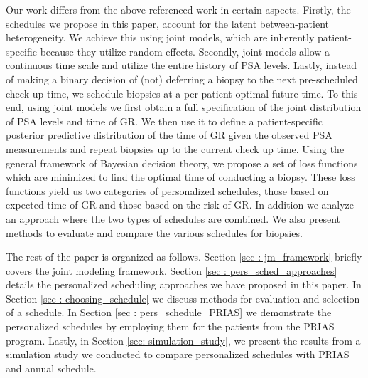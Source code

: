 Our work differs from the above referenced work in certain aspects. Firstly, the schedules we propose in this paper, account for the latent between-patient heterogeneity. We achieve this using joint models, which are inherently patient-specific because they utilize random effects. Secondly, joint models allow a continuous time scale and utilize the entire history of PSA levels. Lastly, instead of making a binary decision of (not) deferring a biopsy to the next pre-scheduled check up time, we schedule biopsies at a per patient optimal future time. To this end, using joint models we first obtain a full specification of the joint distribution of PSA levels and time of GR. We then use it to define a patient-specific posterior predictive distribution of the time of GR given the observed PSA measurements and repeat biopsies up to the current check up time. Using the general framework of Bayesian decision theory, we propose a set of loss functions which are minimized to find the optimal time of conducting a biopsy. These loss functions yield us two categories of personalized schedules, those based on expected time of GR and those based on the risk of GR. In addition we analyze an approach where the two types of schedules are combined. We also present methods to evaluate and compare the various schedules for biopsies.

The rest of the paper is organized as follows. Section \ref{sec : jm_framework} briefly covers the joint modeling framework. Section \ref{sec : pers_sched_approaches} details the personalized scheduling approaches we have proposed in this paper. In Section \ref{sec : choosing_schedule} we discuss methods for evaluation and selection of a schedule. In Section \ref{sec : pers_schedule_PRIAS} we demonstrate the personalized schedules by employing them for the patients from the PRIAS program. Lastly, in Section \ref{sec: simulation_study}, we present the results from a simulation study we conducted to compare personalized schedules with PRIAS and annual schedule.